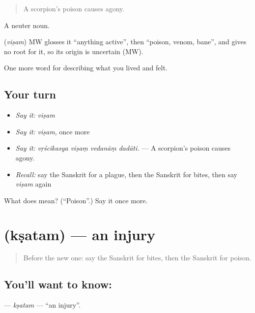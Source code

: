 \begin{quote}
A scorpion's poison causes agony.
\end{quote}

A neuter noun.

\begin{cousinweb}
\textbf{} (\emph{viṣam}) MW glosses it \textquotedblleft{}anything active\textquotedblright{}, then \textquotedblleft{}poison, venom, bane\textquotedblright{}, and gives no root for it, so its origin is uncertain (MW).
\end{cousinweb}

\begin{grammarlens}[title={What you've built}]
One more word for describing what you lived and felt.
\end{grammarlens}

\subsection*{Your turn}
\begin{itemize}
\raggedright
  \item \emph{Say it:} \emph{viṣam}
  \item \emph{Say it:} \emph{viṣam}, once more
  \item \emph{Say it:} \emph{vṛścikasya viṣaṃ vedanāṃ dadāti.} — A scorpion's poison causes agony.
  \item \emph{Recall:} say the Sanskrit for a plague, then the Sanskrit for bites, then say \emph{viṣam} again
\end{itemize}

\begin{tcolorbox}[breakable,colback=teal!4,colframe=teal!35!black,title={Before you move on}]
What does  mean? (\textquotedblleft{}Poison\textquotedblright{}.) Say it once more.
\end{tcolorbox}
\section[\texorpdfstring{\sk{क्षतम्} (kṣatam)}{क्षतम् (kṣatam)}]{ (kṣatam) — an injury}

\label{lesson:SA-C480-ksatam}



\begin{quote}
Before the new one: say the Sanskrit for bites, then the Sanskrit for poison.
\end{quote}

\subsection*{You'll want to know: }
\textbf{} — \emph{kṣatam} — \textquotedblleft{}an injury\textquotedblright{}.

